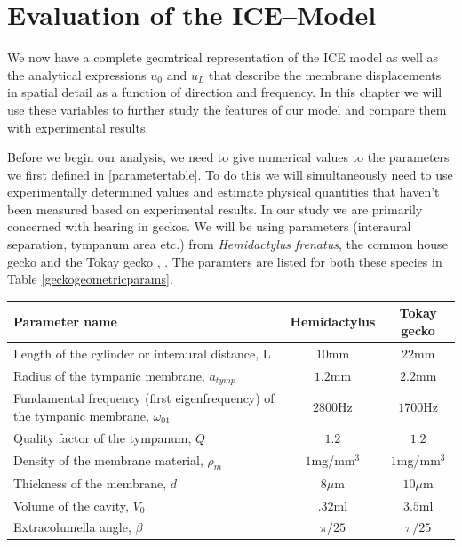 \chapter{Evaluation of the ICE--Model}\label{modelanalysis}
We now have a complete geomtrical representation of the ICE model as well as
 the analytical expressions $u_0$ and $u_L$ that describe the membrane displacements
in spatial detail as a function of direction and frequency. In this chapter we will use these variables
to further study the features of our model and compare them with experimental results.

Before we begin our analysis, we need to give numerical values to the parameters we first defined
in \ref{parametertable}. To do this we will simultaneously need to use experimentally determined
values and estimate physical quantities that haven't been measured based on experimental results. 
In our study we are primarily concerned with hearing in geckos. We will be using
parameters (interaural separation, tympanum area etc.) from \textit{Hemidactylus frenatus}, the common house gecko
\cite{dalsgaardmanley2}
and the Tokay gecko \cite{dalsgaardmanley1}, \cite{dalsgaardtangcarr}. The paramters are listed for both these
species in Table \ref{geckogeometricparams}.

\vspace{\baselineskip}
\noindent
\begin{minipage}{\linewidth}
\renewcommand{\arraystretch}{1.2}
\centering
{}\label{geckogeometricparams}
\begin{tabular}{|p{8.5 cm} | c | c|}
\hline
Parameter name & Hemidactylus & Tokay gecko\\
\hline
Length of the cylinder or interaural distance, L & $10$mm & $22$mm\\
Radius of the tympanic membrane, $a_{tymp}$& $1.2$mm & $2.2$mm\\
Fundamental frequency (first eigenfrequency) of the tympanic membrane, $\omega_{01}$ & $2800$Hz & $1700$Hz\\
Quality factor of the tympanum, $Q$ & $1.2$ &  $1.2$\\
Density of the membrane material, $\rho_m$ & $1$mg/mm$^3$ & $1$mg/mm$^3$\\
Thickness of the membrane, $d$& $8\mu$m & $10\mu$m\\
Volume of the cavity, $V_0$ & $.32$ml & $3.5$ml\\ 
Extracolumella angle, $\beta$ & $\pi/25$ & $\pi/25$\\
\hline
\end {tabular}\par
\bigskip
\end{minipage}


